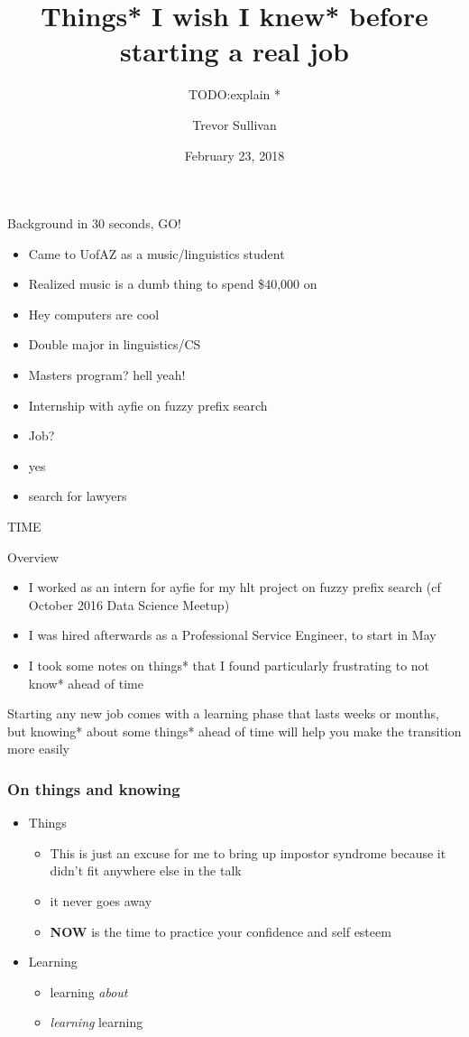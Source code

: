 \documentclass[10pt]{beamer}
\title{Things* I wish I knew* before starting a real job}
\subtitle{TODO:explain *}
\date{February 23, 2018}
\author{Trevor Sullivan}
\begin{document}
\maketitle

\begin{frame}{Background in 30 seconds, GO!}
\pause
    \begin{itemize}[<+->]
    	\item Came to UofAZ as a music/linguistics student
    	\item Realized music is a dumb thing to spend \$40,000 on
    	\item Hey computers are cool
    	\item Double major in linguistics/CS
    	\item Masters program? hell yeah!
    	\item Internship with ayfie on fuzzy prefix search
    	\item Job?
    	\item yes
    	\item search for lawyers
    \end{itemize}
\pause
TIME

\end{frame}

\begin{frame}{Overview}
\pause
\begin{itemize}[<+->]
	\item I worked as an intern for ayfie for my hlt project on fuzzy prefix search
	(cf October 2016 Data Science Meetup)
	\item I was hired afterwards as a Professional Service Engineer, to start in May
	\item I took some notes on things* that I found particularly frustrating to not know* ahead of time
\end{itemize}
\pause
Starting any new job comes with a learning phase that lasts weeks or months, but knowing* about some things* ahead of time will help you make the transition more easily

\end{frame}

\begin{frame}
	\frametitle{On things and knowing}

	\begin{itemize}[<+->]
		\item Things
		\begin{itemize}[<+->]
			\item This is just an excuse for me to bring up \alert{impostor syndrome} because it didn't fit anywhere else in the talk
			\item it never goes away
			\item \textbf{NOW} is the time to practice your confidence and self esteem
		\end{itemize}
		\item Learning
		\begin{itemize}[<+->]
			\item learning \textit{about}
			\item \textit{learning} learning
		\end{itemize}
	\end{itemize}
\end{frame}
\end{document}
